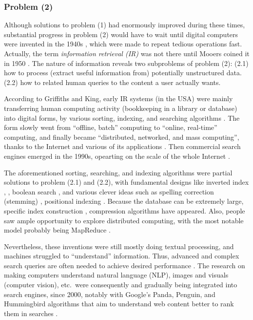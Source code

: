 \documentclass[final-report]{report-template}
\begin{document}
\subsubsection{Problem (2)}
Although solutions to problem (1) had enormously improved during these times,
substantial progress in problem (2) would have to wait until digital computers
were invented in the 1940s \cite{eniac.story}, which were made to repeat
tedious operations fast. Actually, the term \emph{information retrieval (IR)} was
not there until Mooers coined it in 1950 \cite{mooers.info.ret.term}.  The
nature of information reveals two subproblems of problem (2): (2.1) how to
process (extract useful information from) potentially unstructured data. (2.2)
how to related human queries to the content a user actually wants.

According to Griffiths and King, early IR systems (in the USA) were mainly
transferring human computing activity (bookkeeping in a library or database)
into digital forms, by various sorting, indexing, and searching algorithms
\cite{early.info.systems}. The form slowly went from ``offline, batch''
computing to ``online, real-time'' computing, and finally became ``distributed,
networked, and mass computing'', thanks to the Internet and various of its
applications \cite{early.info.systems, history.internet}. Then commercial
search engines emerged in the 1990s, opearting on the scale of the whole
Internet \cite{history.search.engines, history.internet.search.engines}.

The aforementioned sorting, searching, and indexing algorithms were partial
solutions to problem (2.1) and (2.2), with fundamental designs like inverted
index \cite[chap.~2]{intro.info.ret}, \cite[sect.~2]{inverted.files.search},
boolean search \cite[chap.~1]{intro.info.ret}, and various clever ideas such as
spelling correction (stemming) \cite[chap.~3.3]{intro.info.ret}, positional
indexing \cite[sect.~3]{inverted.files.search}. Because the database can be
extremely large, specific index construction \cite[chap.~4]{intro.info.ret},
\cite[sect.~5]{inverted.files.search} compression
\cite[chap.~5]{intro.info.ret} algorithms have appeared. Also, people saw ample
opportunity to explore distributed computing, with the most notable model
probably being MapReduce \cite{mapreduce}.

Nevertheless, these inventions were still mostly doing textual processing, and
machines struggled to ``understand'' information. Thus, advanced and complex
search queries are often needed to achieve desired performance
\cite{advanced.search.necessity.1, advanced.search.necessity.2}. The research
on making computers understand natural language (NLP), images and visuals
(computer vision), etc.\ were consequently and gradually being integrated into
search engines, since 2000, notably with Google's Panda, Penguin, and
Hummingbird algorithms that aim to understand web content better to rank them
in searches \cite{google.new.algos}.
\end{document}
